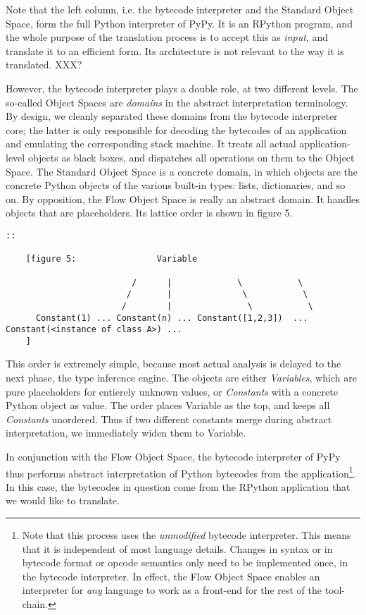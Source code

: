 \documentclass{acm_proc_article-sp}
\begin{document}
Note that the left column, i.e. the bytecode interpreter and the
Standard Object Space, form the full Python interpreter of PyPy.  It is
an RPython program, and the whole purpose of the translation process is
to accept this as \textit{input}, and translate it to an efficient form.  Its
architecture is not relevant to the way it is translated. XXX?

However, the bytecode interpreter plays a double role, at two different
levels.  The so-called Object Spaces are \textit{domains} in the abstract
interpretation terminology.  By design, we cleanly separated these
domains from the bytecode interpreter core; the latter is only
responsible for decoding the bytecodes of an application and emulating
the corresponding stack machine.  It treats all actual application-level
objects as black boxes, and dispatches all operations on them to the
Object Space.  The Standard Object Space is a concrete domain, in which
objects are the concrete Python objects of the various built-in types:
lists, dictionaries, and so on.  By opposition, the Flow Object Space is
really an abstract domain.  It handles objects that are placeholders.
Its lattice order is shown in figure 5.

\begin{verbatim}
::

    [figure 5:                Variable

                         /      |             \           \
                        /       |              \           \
                       /        |               \           \
      Constant(1) ... Constant(n) ... Constant([1,2,3])  ... Constant(<instance of class A>) ...
    ]
\end{verbatim}

This order is extremely simple, because most actual analysis is delayed
to the next phase, the type inference engine.  The objects are either
\textit{Variables}, which are pure placeholders for entierely unknown values,
or \textit{Constants} with a concrete Python object as value.  The order places
Variable as the top, and keeps all \textit{Constants} unordered.  Thus if two
different constants merge during abstract interpretation, we immediately
widen them to Variable.

In conjunction with the Flow Object Space, the bytecode interpreter of
PyPy thus performs abstract interpretation of Python bytecodes from
the application\footnote{Note that this process uses the
\textit{unmodified} bytecode interpreter.  This means that it is
independent of most language details.  Changes in syntax or in
bytecode format or opcode semantics only need to be implemented once,
in the bytecode interpreter.  In effect, the Flow Object Space enables
an interpreter for \textit{any} language to work as a front-end for
the rest of the tool-chain.}.  In this case, the bytecodes in
question come from the RPython application that we would like to
translate.
\end{document}
